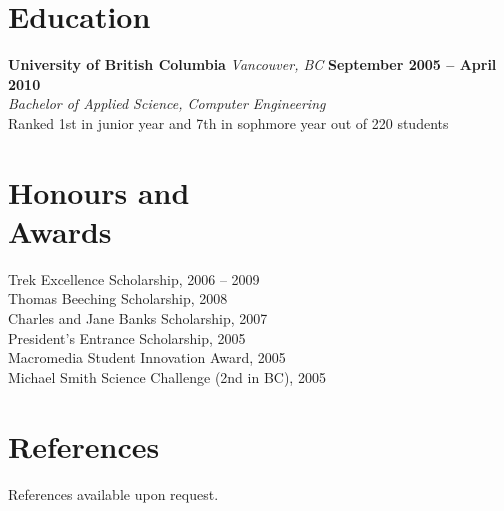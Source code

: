 \documentclass[margin,line]{resume}
\begin{document}
\begin{resume}
	\section{\mysidestyle Education}

	\textbf{University of British Columbia}
		\textsl{ Vancouver, BC}
		\hfill \textbf{September 2005 -- April 2010}
		\vspace{2mm}\\\vspace{1mm}%
	\textsl{Bachelor of Applied Science, Computer Engineering}
		\vspace{1mm}\\
	Ranked 1st in junior year and 7th in sophmore year out of 220 students

	\section{\mysidestyle Honours and\\Awards}

	Trek Excellence Scholarship, 2006 -- 2009
		\vspace{1mm}\\%
	Thomas Beeching Scholarship, 2008
		\vspace{1mm}\\%
	Charles and Jane Banks Scholarship, 2007
		\vspace{1mm}\\%
	President's Entrance Scholarship, 2005
		\vspace{1mm}\\%
	Macromedia Student Innovation Award, 2005
		\vspace{1mm}\\%
	Michael Smith Science Challenge (2nd in BC), 2005

	\section{\mysidestyle References}
	References available upon request.


\end{resume}
\end{document}
